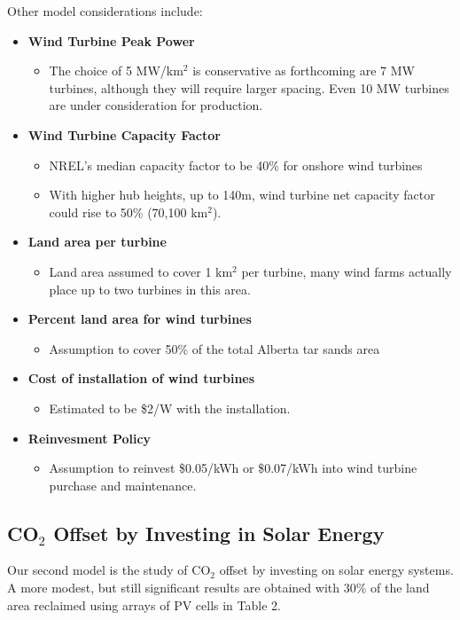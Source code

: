 \documentclass[11pt]{article}
\begin{document}
\noindent Other model considerations include:
\begin{itemize}
\item {\bf Wind Turbine Peak Power}
\begin{itemize}
\item The choice of 5 MW/km$^2$ is conservative as forthcoming are 7 MW turbines, although they will require larger spacing.  Even 10 MW turbines are under consideration for production.
\newpage
\end{itemize}
\item {\bf Wind Turbine Capacity Factor}
\begin{itemize}
\item NREL's median capacity factor to be 40\% for onshore wind turbines
\item With higher hub heights, up to 140m, wind turbine net capacity factor could rise to 50\% (70,100 km$^2$).
\end{itemize}
\item {\bf Land area per turbine}
\begin{itemize}
\item Land area assumed to cover 1 km$^2$ per turbine, many wind farms actually place up to two turbines in this area.
\end{itemize}
\item {\bf Percent land area for wind turbines}
\begin{itemize}
\item Assumption to cover 50\% of the total Alberta tar sands area
\end{itemize}
\item {\bf Cost of installation of wind turbines}
\begin{itemize}
\item Estimated to be \$2/W with the installation.
\end{itemize}
\item {\bf Reinvesment Policy}
\begin{itemize}
\item Assumption to reinvest \$0.05/kWh or \$0.07/kWh into wind turbine purchase and maintenance.
\end{itemize}
\end{itemize}

\subsection{CO$_2$ Offset by Investing in Solar Energy}

Our second model is the study of CO$_2$ offset by investing on solar energy systems. A more modest, but still significant results are obtained with 30\% of the land area reclaimed using arrays of PV cells in Table 2.
\end{document}

